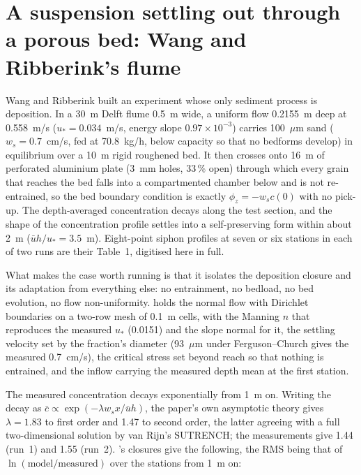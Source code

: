 
\section{A suspension settling out through a porous bed: Wang and Ribberink's flume}

Wang and Ribberink \cite{WangRibberink1986} built an experiment whose only
sediment process is deposition. In a 30~m Delft flume 0.5~m wide, a uniform
flow 0.2155~m deep at 0.558~m/s ($u_* = 0.034$~m/s, energy slope
$0.97\times10^{-3}$) carries 100~$\mu$m sand ($w_s = 0.7$~cm/s, fed at
70.8~kg/h, below capacity so that no bedforms develop) in equilibrium over a
10~m rigid roughened bed. It then crosses onto 16~m of perforated aluminium
plate (3~mm holes, 33\,\% open) through which every grain that reaches the
bed falls into a compartmented chamber below and is not re-entrained, so the
bed boundary condition is exactly $\phi_z = -w_s c(0)$ with no pick-up. The
depth-averaged concentration decays along the test section, and the shape of
the concentration profile settles into a self-preserving form within about
2~m ($\bar u h/u_* = 3.5$~m). Eight-point siphon profiles at seven or six
stations in each of two runs are their Table~1, digitised here in full.

What makes the case worth running is that it isolates the deposition closure
and its adaptation from everything else: no entrainment, no bedload, no bed
evolution, no flow non-uniformity. \anuga{} holds the normal flow with
Dirichlet boundaries on a two-row mesh of 0.1~m cells, with the Manning $n$
that reproduces the measured $u_*$ (0.0151) and the slope normal for it, the
settling velocity set by the fraction's diameter (93~$\mu$m under
Ferguson--Church gives the measured 0.7~cm/s), the critical stress set
beyond reach so that nothing is entrained, and the inflow carrying the
measured depth mean at the first station.

The measured concentration decays exponentially from 1~m on. Writing the
decay as $\bar c \propto \exp(-\lambda w_s x/\bar u h)$, the paper's own
asymptotic theory gives $\lambda = 1.83$ to first order and 1.47 to second
order, the latter agreeing with a full two-dimensional solution by van Rijn's
SUTRENCH; the measurements give 1.44 (run~1) and 1.55 (run~2). \anuga{}'s
closures give the following, the RMS being that of
$\ln(\text{model}/\text{measured})$ over the stations from 1~m on:

